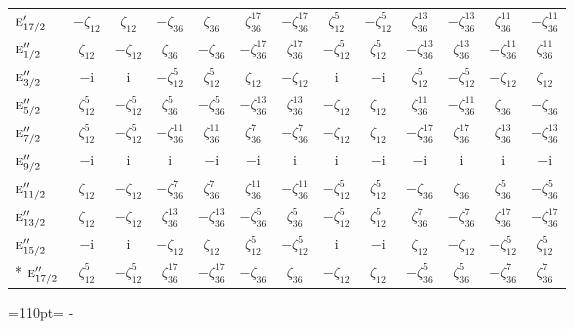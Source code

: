 \documentclass[10pt,a4paper]{article}
\newcommand{\needspace}[1]{\par\penalty-100\begingroup\dimen0=#1\relax\dimen2=\pagegoal
  \advance\dimen2-\pagetotal\ifdim\dimen0>\dimen2\relax\ifdim\dimen2>0pt\vfil\break\fi\fi
  \endgroup}
\numberwithin{equation}{section}
\newcommand{\irr}[1]{\text{\normalfont\scshape #1}}
\newcommand{\iunit}{\mathrm{i}}
\newcommand{\rootunity}[1]{\zeta_{#1}}
\begin{document}
{\begin{longtable}{@{}lcccccccccccc@{}}
$\irr{e}_{17/2}'$ & $-\rootunity{12}$ & $\rootunity{12}$ & $-\rootunity{36}$ & $\rootunity{36}$ & $\rootunity{36}^{17}$ & $-\rootunity{36}^{17}$ & $\rootunity{12}^{5}$ & $-\rootunity{12}^{5}$ & $\rootunity{36}^{13}$ & $-\rootunity{36}^{13}$ & $\rootunity{36}^{11}$ & $-\rootunity{36}^{11}$\\
$\irr{e}_{1/2}''$ & $\rootunity{12}$ & $-\rootunity{12}$ & $\rootunity{36}$ & $-\rootunity{36}$ & $-\rootunity{36}^{17}$ & $\rootunity{36}^{17}$ & $-\rootunity{12}^{5}$ & $\rootunity{12}^{5}$ & $-\rootunity{36}^{13}$ & $\rootunity{36}^{13}$ & $-\rootunity{36}^{11}$ & $\rootunity{36}^{11}$\\
$\irr{e}_{3/2}''$ & $-\iunit{}$ & $\iunit{}$ & $-\rootunity{12}^{5}$ & $\rootunity{12}^{5}$ & $\rootunity{12}$ & $-\rootunity{12}$ & $\iunit{}$ & $-\iunit{}$ & $\rootunity{12}^{5}$ & $-\rootunity{12}^{5}$ & $-\rootunity{12}$ & $\rootunity{12}$\\
$\irr{e}_{5/2}''$ & $\rootunity{12}^{5}$ & $-\rootunity{12}^{5}$ & $\rootunity{36}^{5}$ & $-\rootunity{36}^{5}$ & $-\rootunity{36}^{13}$ & $\rootunity{36}^{13}$ & $-\rootunity{12}$ & $\rootunity{12}$ & $\rootunity{36}^{11}$ & $-\rootunity{36}^{11}$ & $\rootunity{36}$ & $-\rootunity{36}$\\
$\irr{e}_{7/2}''$ & $\rootunity{12}^{5}$ & $-\rootunity{12}^{5}$ & $-\rootunity{36}^{11}$ & $\rootunity{36}^{11}$ & $\rootunity{36}^{7}$ & $-\rootunity{36}^{7}$ & $-\rootunity{12}$ & $\rootunity{12}$ & $-\rootunity{36}^{17}$ & $\rootunity{36}^{17}$ & $\rootunity{36}^{13}$ & $-\rootunity{36}^{13}$\\
$\irr{e}_{9/2}''$ & $-\iunit{}$ & $\iunit{}$ & $\iunit{}$ & $-\iunit{}$ & $-\iunit{}$ & $\iunit{}$ & $\iunit{}$ & $-\iunit{}$ & $-\iunit{}$ & $\iunit{}$ & $\iunit{}$ & $-\iunit{}$\\
$\irr{e}_{11/2}''$ & $\rootunity{12}$ & $-\rootunity{12}$ & $-\rootunity{36}^{7}$ & $\rootunity{36}^{7}$ & $\rootunity{36}^{11}$ & $-\rootunity{36}^{11}$ & $-\rootunity{12}^{5}$ & $\rootunity{12}^{5}$ & $-\rootunity{36}$ & $\rootunity{36}$ & $\rootunity{36}^{5}$ & $-\rootunity{36}^{5}$\\
$\irr{e}_{13/2}''$ & $\rootunity{12}$ & $-\rootunity{12}$ & $\rootunity{36}^{13}$ & $-\rootunity{36}^{13}$ & $-\rootunity{36}^{5}$ & $\rootunity{36}^{5}$ & $-\rootunity{12}^{5}$ & $\rootunity{12}^{5}$ & $\rootunity{36}^{7}$ & $-\rootunity{36}^{7}$ & $\rootunity{36}^{17}$ & $-\rootunity{36}^{17}$\\
$\irr{e}_{15/2}''$ & $-\iunit{}$ & $\iunit{}$ & $-\rootunity{12}$ & $\rootunity{12}$ & $\rootunity{12}^{5}$ & $-\rootunity{12}^{5}$ & $\iunit{}$ & $-\iunit{}$ & $\rootunity{12}$ & $-\rootunity{12}$ & $-\rootunity{12}^{5}$ & $\rootunity{12}^{5}$\\*
$\irr{e}_{17/2}''$ & $\rootunity{12}^{5}$ & $-\rootunity{12}^{5}$ & $\rootunity{36}^{17}$ & $-\rootunity{36}^{17}$ & $-\rootunity{36}$ & $\rootunity{36}$ & $-\rootunity{12}$ & $\rootunity{12}$ & $-\rootunity{36}^{5}$ & $\rootunity{36}^{5}$ & $-\rootunity{36}^{7}$ & $\rootunity{36}^{7}$\\
\bottomrule\end{longtable}}
\needspace{110pt}
\end{document}
